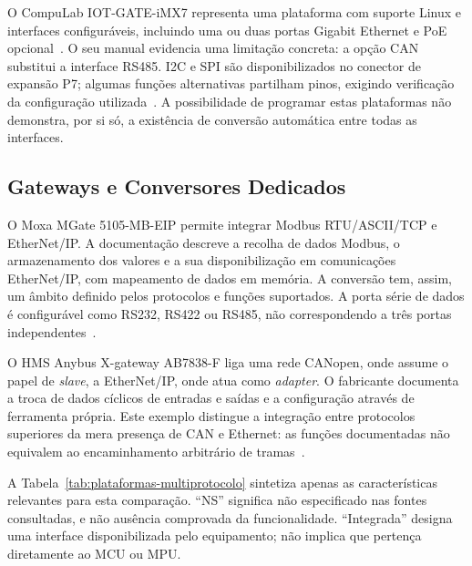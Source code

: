O CompuLab IOT-GATE-iMX7 representa uma plataforma com suporte Linux
e interfaces configuráveis, incluindo uma ou duas portas Gigabit Ethernet
e PoE opcional~\cite{compulab_imx7}.
O seu manual evidencia uma limitação concreta: a opção CAN substitui
a interface RS485. I2C e SPI são disponibilizados no conector de
expansão P7; algumas funções alternativas partilham pinos, exigindo
verificação da configuração utilizada~\cite{compulab_imx7_manual_2018}.
A possibilidade de programar estas plataformas não demonstra, por si
só, a existência de conversão automática entre todas as interfaces.

\subsection{Gateways e Conversores Dedicados}

O Moxa MGate 5105-MB-EIP permite integrar Modbus RTU/ASCII/TCP e
EtherNet/IP. A documentação descreve a recolha de dados Modbus,
o armazenamento dos valores e a sua disponibilização em comunicações
EtherNet/IP, com mapeamento de dados em memória. A conversão tem,
assim, um âmbito definido pelos protocolos e funções suportados.
A porta série de dados é configurável como RS232, RS422 ou RS485,
não correspondendo a três portas independentes~\cite{moxa_mgate5105}.

O HMS Anybus X-gateway AB7838-F liga uma rede CANopen, onde assume
o papel de \textit{slave}, a EtherNet/IP, onde atua como
\textit{adapter}. O fabricante documenta a troca de dados cíclicos de
entradas e saídas e a configuração através de ferramenta própria.
Este exemplo distingue a integração entre protocolos superiores da
mera presença de CAN e Ethernet: as funções documentadas não
equivalem ao encaminhamento arbitrário de tramas~\cite{hms_ab7838}.

A Tabela~\ref{tab:plataformas-multiprotocolo} sintetiza apenas as
características relevantes para esta comparação. \enquote{NS} significa
não especificado nas fontes consultadas, e não ausência comprovada
da funcionalidade. \enquote{Integrada} designa uma interface disponibilizada
pelo equipamento; não implica que pertença diretamente ao MCU ou MPU.

